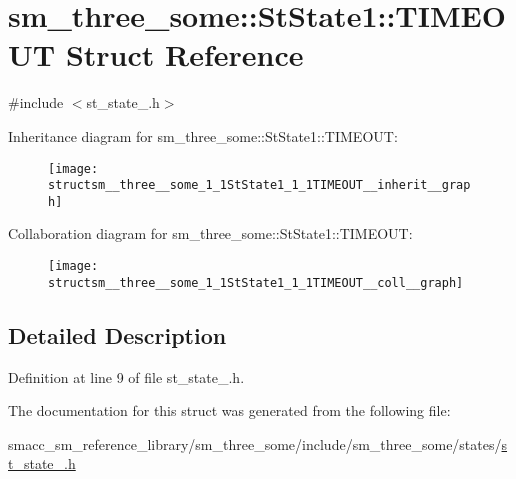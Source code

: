 \hypertarget{structsm__three__some_1_1StState1_1_1TIMEOUT}{}\section{sm\+\_\+three\+\_\+some\+:\+:St\+State1\+:\+:T\+I\+M\+E\+O\+UT Struct Reference}
\label{structsm__three__some_1_1StState1_1_1TIMEOUT}


{\ttfamily \#include $<$st\+\_\+state\+\_.\+h$>$}



Inheritance diagram for sm\+\_\+three\+\_\+some\+:\+:St\+State1\+:\+:T\+I\+M\+E\+O\+UT\+:
\nopagebreak
\begin{figure}[H]
\begin{center}
\leavevmode
\texttt{[image: structsm\_\_three\_\_some\_1\_1StState1\_1\_1TIMEOUT\_\_inherit\_\_graph]}
\end{center}
\end{figure}


Collaboration diagram for sm\+\_\+three\+\_\+some\+:\+:St\+State1\+:\+:T\+I\+M\+E\+O\+UT\+:
\nopagebreak
\begin{figure}[H]
\begin{center}
\leavevmode
\texttt{[image: structsm\_\_three\_\_some\_1\_1StState1\_1\_1TIMEOUT\_\_coll\_\_graph]}
\end{center}
\end{figure}


\subsection{Detailed Description}


Definition at line 9 of file st\+\_\+state\+\_.\+h.



The documentation for this struct was generated from the following file\+:\begin{DoxyCompactItemize}
\item 
smacc\+\_\+sm\+\_\+reference\+\_\+library/sm\+\_\+three\+\_\+some/include/sm\+\_\+three\+\_\+some/states/\hyperlink{sm__three__some_2include_2sm__three__some_2states_2st__state__1_8h}{st\+\_\+state\+\_.\+h}\end{DoxyCompactItemize}
